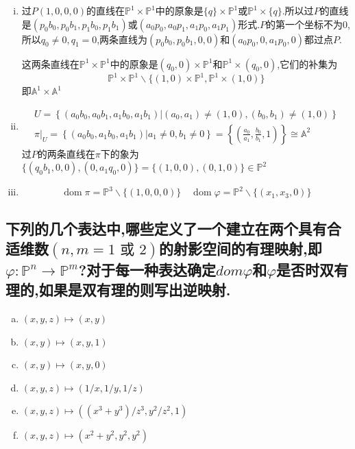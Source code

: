\documentclass[UTF8]{book}
\begin{document}
\begin{enumerate}[(i)]
			\item 过$ P(1,0,0,0) $的直线在$ \mathbb{P}^{1} \times \mathbb{P}^{1} $中的原象是$ \{q\} \times \mathbb{P}^{1} $或$ \mathbb{P}^{1} \times  \{q\}$.所以过$ P $的直线是$ (p_{0}b_{0}, p_{0}b_{1}, p_{1}b_{0}, p_{1} b_{1}) $或$ (a_{0}p_{0}, a_{0}p_{1}, a_{1}p_{0}, a_{1} p_{1}) $形式.$ P $的第一个坐标不为$ 0 $,所以$ q_{0} \neq 0,q_{1} = 0 $,两条直线为$ (p_{0}b_{0}, p_{0}b_{1}, 0,0 )$和$ (a_{0}p_{0},0, a_{1}p_{0}, 0) $都过点$ P $.
			
			这两条直线在$ \mathbb{P}^{1} \times \mathbb{P}^{1} $中的原象是$ (q_{0},0)\times \mathbb{P}^{1} $和$ \mathbb{P}^{1} \times (q_{0},0) $,它们的补集为
			\begin{equation*}\mathbb{P}^{1} \times \mathbb{P}^{1} \backslash \{(1,0)\times \mathbb{P}^{1},\mathbb{P}^{1} \times(1,0)\}\end{equation*}
			即$ \mathbb{A}^{1} \times \mathbb{A}^{1} $
			
			\item \begin{equation*}\begin{array}{l}
			U=\left\{\left(a_{0} b_{0}, a_{0} b_{1}, a_{1} b_{0}, a_{1} b_{1}\right) |\left(a_{0}, a_{1}\right) \neq(1,0),\left(b_{0},b_{1}\right) \neq(1,0)\right\} \\
			\left.\pi\right|_{U}=\left\{\left(a_{0} b_{0}, a_{1} b_{0}, a_{1} b_{1}\right) | a_{1} \neq 0, b_{1} \neq 0\right\}=\left\{\left(\frac{a_{0}}{a_{1}}, \frac{b_{0}}{b_{1}}, 1\right)\right\} \cong \mathbb{A}^{2}
			\end{array}\end{equation*}
			过$ P $的两条直线在$ \pi $下的象为$ \{(q_{0}b_{1},0,0),(0,a_{1}q_{0},0)\}=\{(1,0,0),(0,1,0)\} \in \mathbb{P}^{2} $
			
			\item 
			\begin{equation*}\operatorname{dom} \pi=\mathbb{P}^{3}\backslash\{(1,0,0,0)\} \quad \operatorname{dom} \varphi= \mathbb{P}^{2} \backslash\{(x_{1}, x_{3}, 0)\}\end{equation*}
		\end{enumerate}
		\subsection{下列的几个表达中,哪些定义了一个建立在两个具有合适维数$(n, m=1 \text { 或 } 2) $的射影空间的有理映射,即$\varphi: \mathbb{P} ^{n} \rightarrow \mathbb{ P} ^{m}$?对于每一种表达确定$ dom \varphi $和$ \varphi $是否时双有理的,如果是双有理的则写出逆映射.}
		\begin{enumerate}[(a)]
			\item $(x, y, z) \mapsto(x, y)$ 
			\item $(x, y) \mapsto(x, y, 1)$ 
			\item $(x, y) \mapsto(x, y, 0)$
			\item $(x, y, z) \mapsto(1 / x, 1 / y, 1 / z)$ 
			\item $(x, y, z) \mapsto\left(\left(x^{3}+y^{3}\right) / z^{3}, y^{2} / z^{2}, 1\right)$
			\item  $(x, y, z) \mapsto\left(x^{2}+y^{2}, y^{2}, y^{2}\right)$
		\end{enumerate}
	
\end{document}
